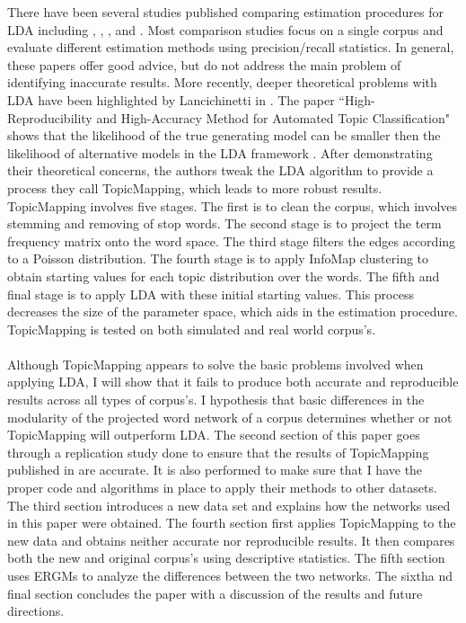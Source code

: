 \documentclass[12pt]{article}
\begin{document}
There have been several studies published comparing estimation procedures for LDA including \cite{BleiComp}, \cite{Comp}, \cite{CVB}, and \cite{Comp2}. Most comparison studies focus on a single corpus and evaluate different estimation methods using precision/recall statistics. In general, these papers offer good advice, but do not address the main problem of identifying inaccurate results. More recently, deeper theoretical problems with LDA have been highlighted by Lancichinetti in \cite{main}. The paper ``High-Reproducibility and High-Accuracy Method for Automated Topic Classification" shows that the likelihood of the true generating model can be smaller then the likelihood of alternative models in the LDA framework \cite{main}. After demonstrating their theoretical concerns, the authors tweak the LDA algorithm to provide a process they call TopicMapping, which leads to more robust results. TopicMapping involves five stages. The first is to clean the corpus, which involves stemming and removing of stop words. The second stage is to project the term frequency matrix onto the word space. The third stage filters the edges according to a Poisson distribution. The fourth stage is to apply InfoMap clustering to obtain starting values for each topic distribution over the words. The fifth and final stage is to apply LDA with these initial starting values. This process decreases the size of the parameter space, which aids in the estimation procedure. TopicMapping is tested on both simulated and real world corpus's.    
\\
\\
Although TopicMapping appears to solve the basic problems involved when applying LDA, I will show that it fails to produce both accurate and reproducible results across all types of corpus's. I hypothesis that basic differences in the modularity of the projected word network of a corpus determines whether or not TopicMapping will outperform LDA. The second section of this paper goes through a replication study done to ensure that the results of TopicMapping published in \cite{main} are accurate. It is also performed to make sure that I have the proper code and algorithms in place to apply their methods to other datasets. The third section introduces a new data set and explains how the networks used in this paper were obtained. The fourth section first applies TopicMapping to the new data and obtains neither accurate nor reproducible results. It then compares both the new and original corpus's using descriptive statistics. The fifth section uses ERGMs to analyze the differences between the two networks. The sixtha nd final section concludes the paper with a discussion of the results and future directions.
\end{document}
